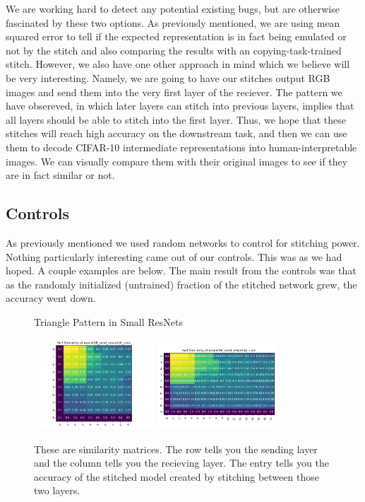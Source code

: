 \documentclass{article} %
\begin{document}
We are working hard to detect any potential existing bugs, but are otherwise fascinated by these two options. As
previously mentioned, we are using mean squared error to tell if the expected representation is in fact being emulated
or not by the stitch and also comparing the results with an copying-task-trained stitch. However, we also have one other
approach in mind which we believe will be very interesting. Namely, we are going to have our stitches output RGB images
and send them into the very first layer of the reciever. The pattern we have obsereved, in which later layers can stitch
into previous layers, implies that all layers should be able to stitch into the first layer. Thus, we hope that these
stitches will reach high accuracy on the downstream task, and then we can use them to decode CIFAR-10 intermediate
representations into human-interpretable images. We can visually compare them with their original images to see if
they are in fact similar or not.

\subsection*{Controls}
As previously mentioned we used random networks to control for stitching power. Nothing particularly interesting
came out of our controls. This was as we had hoped. A couple examples are below. The main result from the controls
was that as the randomly initialized (untrained) fraction of the stitched network grew, the accuracy went down.

\begin{center}
   \begin{figure}[h!]
      \centering
      \caption{Triangle Pattern in Small ResNets}
      \includegraphics[width=4.5cm]{resnet18_rand_resnet18_sims.png}
      \includegraphics[width=4.5cm]{resnet18_rand_resnet34_sims.png}
      \caption*{These are similarity matrices. The row tells you the sending layer and the column tells you the recieving layer.
      The entry tells you the accuracy of the stitched model created by stitching between those two layers.}
   \end{figure}
\end{center}
\end{document}
